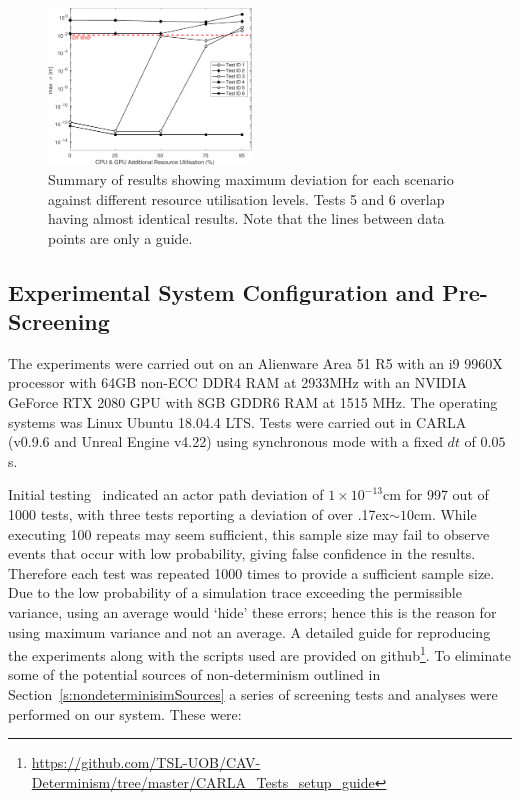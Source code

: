 \begin{figure}[t]
    \centering
    \includegraphics[width=0.48\textwidth]{../other/figures/ExperimentsStressSummaryV6.pdf}
    \caption{Summary of results showing maximum deviation for each scenario against different resource utilisation levels. Tests 5 and 6 overlap having almost identical results. Note that the lines between data points are only a guide.}
    \label{ExperimentsStressSummary}
\end{figure}



\DIFaddbegin 

\DIFaddend \subsection{Experimental System Configuration and Pre-Screening}\label{s:screening}
The experiments were carried out on an Alienware Area 51 R5 with an i9 9960X processor with 64GB non-ECC DDR4 RAM at 2933MHz with an NVIDIA GeForce RTX 2080 GPU with 8GB GDDR6 RAM at 1515 MHz. The operating systems was Linux Ubuntu 18.04.4 LTS. Tests were carried out in CARLA (v0.9.6 and Unreal Engine v4.22) using synchronous mode with a fixed $dt$ of $0.05$s. 

Initial testing~\cite{TSLUnrealEngineTesting} indicated an actor path deviation of $1\times10^{-13}$cm for 997 out of 1000 tests, with three tests reporting a deviation of over {\raise.17ex\hbox{$\scriptstyle\sim$}}$10$cm. While executing 100 repeats may seem sufficient, this sample size may fail to observe events that occur with low probability, giving false confidence in the results. Therefore each test was repeated 1000 times to provide a sufficient sample size. 
%
Due to the low probability of a simulation trace exceeding the permissible variance, using an average would `hide' these errors; hence this is the reason for using maximum variance and not an average.
%
A detailed guide for reproducing the experiments along with the scripts used are provided on github\footnote{\url{https://github.com/TSL-UOB/CAV-Determinism/tree/master/CARLA_Tests_setup_guide}}. To eliminate some of the potential sources of non-determinism outlined in Section~\ref{s:nondeterminisimSources} a series of screening tests and analyses were performed on our system. These were:

